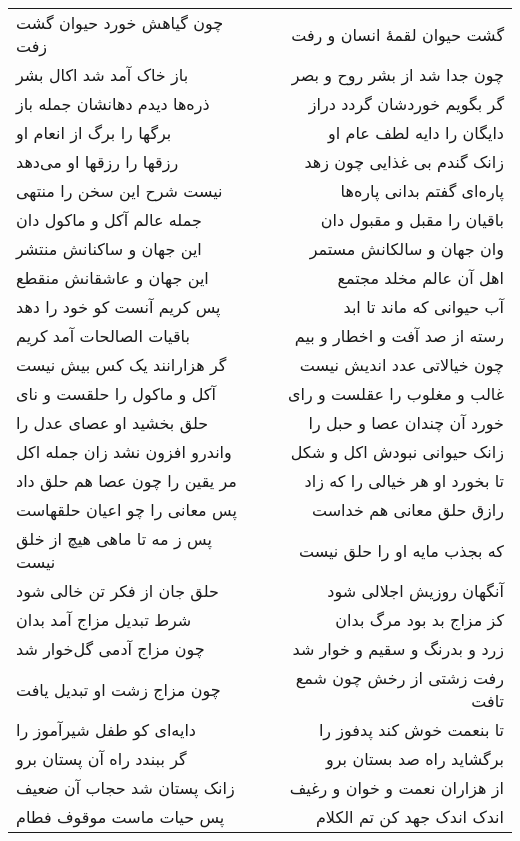 \begin{center}
\begin{longtable}{l p{0.5cm} r}
\\
چون گیاهش خورد حیوان گشت زفت
&&
گشت حیوان لقمهٔ انسان و رفت
\\
باز خاک آمد شد اکال بشر
&&
چون جدا شد از بشر روح و بصر
\\
ذره‌ها دیدم دهانشان جمله باز
&&
گر بگویم خوردشان گردد دراز
\\
برگها را برگ از انعام او
&&
دایگان را دایه لطف عام او
\\
رزقها را رزقها او می‌دهد
&&
زانک گندم بی غذایی چون زهد
\\
نیست شرح این سخن را منتهی
&&
پاره‌ای گفتم بدانی پاره‌ها
\\
جمله عالم آکل و ماکول دان
&&
باقیان را مقبل و مقبول دان
\\
این جهان و ساکنانش منتشر
&&
وان جهان و سالکانش مستمر
\\
این جهان و عاشقانش منقطع
&&
اهل آن عالم مخلد مجتمع
\\
پس کریم آنست کو خود را دهد
&&
آب حیوانی که ماند تا ابد
\\
باقیات الصالحات آمد کریم
&&
رسته از صد آفت و اخطار و بیم
\\
گر هزارانند یک کس بیش نیست
&&
چون خیالاتی عدد اندیش نیست
\\
آکل و ماکول را حلقست و نای
&&
غالب و مغلوب را عقلست و رای
\\
حلق بخشید او عصای عدل را
&&
خورد آن چندان عصا و حبل را
\\
واندرو افزون نشد زان جمله اکل
&&
زانک حیوانی نبودش اکل و شکل
\\
مر یقین را چون عصا هم حلق داد
&&
تا بخورد او هر خیالی را که زاد
\\
پس معانی را چو اعیان حلقهاست
&&
رازق حلق معانی هم خداست
\\
پس ز مه تا ماهی هیچ از خلق نیست
&&
که بجذب مایه او را حلق نیست
\\
حلق جان از فکر تن خالی شود
&&
آنگهان روزیش اجلالی شود
\\
شرط تبدیل مزاج آمد بدان
&&
کز مزاج بد بود مرگ بدان
\\
چون مزاج آدمی گل‌خوار شد
&&
زرد و بدرنگ و سقیم و خوار شد
\\
چون مزاج زشت او تبدیل یافت
&&
رفت زشتی از رخش چون شمع تافت
\\
دایه‌ای کو طفل شیرآموز را
&&
تا بنعمت خوش کند پدفوز را
\\
گر ببندد راه آن پستان برو
&&
برگشاید راه صد بستان برو
\\
زانک پستان شد حجاب آن ضعیف
&&
از هزاران نعمت و خوان و رغیف
\\
پس حیات ماست موقوف فطام
&&
اندک اندک جهد کن تم الکلام
\\

\end{longtable}
\end{center}
